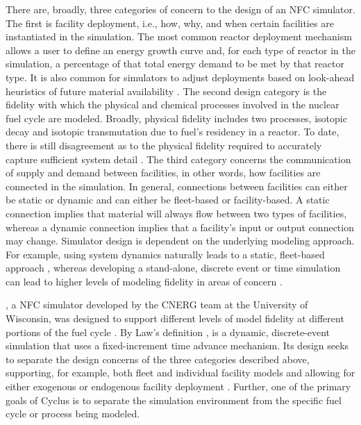 There are, broadly, three categories of concern to the design of an NFC
simulator. The first is facility deployment, i.e., how, why, and when certain
facilities are instantiated in the simulation. The most common reactor
deployment mechanism allows a user to define an energy growth curve and, for
each type of reactor in the simulation, a percentage of that total energy demand
to be met by that reactor type. It is also common for simulators to adjust
deployments based on look-ahead heuristics of future material availability
\cite{schweitzer_improved_2008, van_den_durpel_daness_2009}. The second design
category is the fidelity with which the physical and chemical processes involved
in the nuclear fuel cycle are modeled. Broadly, physical fidelity includes two
processes, isotopic decay and isotopic transmutation due to fuel's residency in
a reactor. To date, there is still disagreement as to the physical fidelity
required to accurately capture sufficient system detail \cite{guerin_impact_2009}. The
third category concerns the communication of supply and demand between
facilities, in other words, how facilities are connected in the simulation. In
general, connections between facilities can either be static or dynamic and can
either be fleet-based or facility-based. A static connection implies that
material will always flow between two types of facilities, whereas a dynamic
connection implies that a facility's input or output connection may
change. Simulator design is dependent on the underlying modeling approach. For
example, using system dynamics \cite{forrester1971counterintuitive} naturally
leads to a static, fleet-based approach \cite{busquim_e_silva_system_2008,
  durpel_daness_2003, yacout_vision_2006}, whereas developing a stand-alone,
discrete event or time simulation \cite{Law:1999:SMA:554952} can lead to higher
levels of modeling fidelity in areas of concern \cite{schneider_nfcsim:_2005,
  mouginot2012class, boucher_cosi:_2006}.

\Cyclus, a NFC simulator developed by the CNERG team at the University of
Wisconsin, was designed to support different levels of model fidelity at
different portions of the fuel cycle \cite{huff_cyclus_2015}. By Law's
definition \cite{Law:1999:SMA:554952}, \Cyclus is a dynamic, discrete-event
simulation that uses a fixed-increment time advance mechanism. Its design seeks
to separate the design concerns of the three categories described above,
supporting, for example, both fleet and individual facility models and allowing
for either exogenous or endogenous facility deployment
\cite{carlsen_fleet_2016}. Further, one of the primary goals of Cyclus is to separate the simulation environment from the specific fuel cycle or process being modeled.

